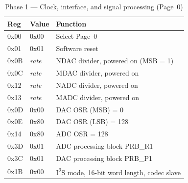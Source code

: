 \begin{table}[H]
    \centering
    \caption{Phase 1 — Clock, interface, and signal processing (Page~0)}
    \label{tab:codec-regs-p0-init}
    \small
    \begin{tabular}{llp{9cm}}
        \toprule
        \textbf{Reg} & \textbf{Value} & \textbf{Function} \\
        \midrule
        0x00 & 0x00 & Select Page~0 \\
        0x01 & 0x01 & Software reset \\
        0x0B & \textit{rate} & NDAC divider, powered on (MSB = 1) \\
        0x0C & \textit{rate} & MDAC divider, powered on \\
        0x12 & \textit{rate} & NADC divider, powered on \\
        0x13 & \textit{rate} & MADC divider, powered on \\
        0x0D & 0x00 & DAC OSR (MSB) = 0 \\
        0x0E & 0x80 & DAC OSR (LSB) = 128 \\
        0x14 & 0x80 & ADC OSR = 128 \\
        0x3D & 0x01 & ADC processing block PRB\_R1 \\
        0x3C & 0x01 & DAC processing block PRB\_P1 \\
        0x1B & 0x00 & I\textsuperscript{2}S mode, 16-bit word length, codec slave \\
        \bottomrule
    \end{tabular}
\end{table}

